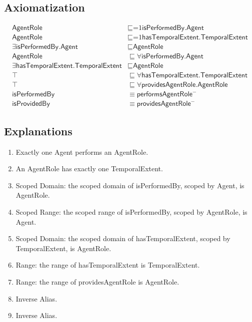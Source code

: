 \subsection{Axiomatization}
\label{axs:AgentRole}
\begin{align}
\textsf{AgentRole} &\sqsubseteq \text{=1}\textsf{isPerformedBy.Agent} \\
\textsf{AgentRole} &\sqsubseteq \text{=1}\textsf{hasTemporalExtent.TemporalExtent} \\
\exists\textsf{isPerformedBy.Agent} &\sqsubseteq \textsf{AgentRole} \\
\textsf{AgentRole} &\sqsubseteq \forall\textsf{isPerformedBy.Agent} \\
\exists\textsf{hasTemporalExtent.TemporalExtent} &\sqsubseteq \textsf{AgentRole} \\
\top &\sqsubseteq \forall\textsf{hasTemporalExtent.TemporalExtent} \\
\top &\sqsubseteq \forall\textsf{providesAgentRole.AgentRole} \\
\textsf{isPerformedBy} &\equiv \textsf{performsAgentRole}^- \\
\textsf{isProvidedBy} &\equiv \textsf{providesAgentRole}^-
\end{align}

\subsection{Explanations}
\label{exp:AgentRole}
\begin{enumerate}
\item Exactly one \textsf{Agent} performs an \textsf{AgentRole}.
\item An \textsf{AgentRole} has exactly one \textsf{TemporalExtent}.
\item Scoped Domain: the scoped domain of \textsf{isPerformedBy}, scoped by \textsf{Agent}, is \textsf{AgentRole}.
\item Scoped Range: the scoped range of \textsf{isPerformedBy}, scoped by \textsf{AgentRole}, is \textsf{Agent}. 
\item Scoped Domain: the scoped domain of \textsf{hasTemporalExtent}, scoped by \textsf{TemporalExtent}, is \textsf{AgentRole}.
\item Range: the range of \textsf{hasTemporalExtent} is \textsf{TemporalExtent}.
\item Range:  the range of \textsf{providesAgentRole} is \textsf{AgentRole}.
\item Inverse Alias.
\item Inverse Alias.
\end{enumerate}

